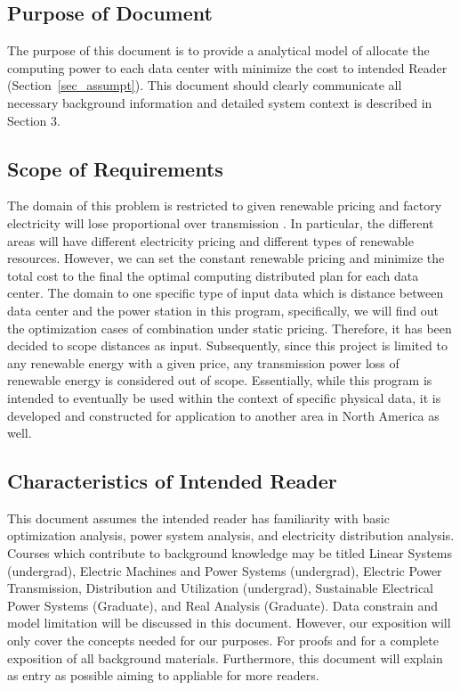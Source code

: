 \documentclass[12pt]{article}
\begin{document}
\subsection{Purpose of Document}

{The purpose of this document is to provide a analytical model of allocate the computing power to each data center with minimize the cost to intended Reader (Section~\ref{sec_assumpt}).  This document should clearly
communicate all necessary background information and detailed system context is described in Section 3.}

\subsection{Scope of Requirements} 

 {The domain of this problem is restricted to given renewable pricing and factory electricity will lose proportional over transmission . In particular, the different areas will have different electricity pricing and different types of renewable resources. However, we can set the constant renewable pricing and minimize the total cost to the final the optimal computing distributed plan for each data center. The domain to one specific type of input data which is distance between data center and the power station in this program, specifically, we will find out the optimization cases of combination under static pricing. Therefore, it has been decided to scope distances as input. Subsequently, since this project is limited to any renewable energy with a given price, any transmission power loss of renewable energy is considered out of scope. Essentially, while this program is intended to eventually be used within the context of specific physical data, it is developed and constructed for application to another area in North America as well.}  


\subsection{Characteristics of Intended Reader} \label{sec_IntendedReader}

{This document assumes the intended reader has familiarity with basic optimization analysis, power system analysis, and electricity distribution analysis. Courses which contribute to background knowledge may be titled Linear Systems (undergrad), Electric Machines and Power Systems (undergrad), Electric Power Transmission, Distribution and Utilization (undergrad), Sustainable Electrical Power Systems (Graduate), and Real Analysis (Graduate). Data constrain and model limitation will be discussed in this document. However, our exposition will only cover the concepts needed for our purposes. For proofs and for a complete exposition of all background materials. Furthermore, this document will explain as entry as possible aiming to appliable for more readers.}
\end{document}
